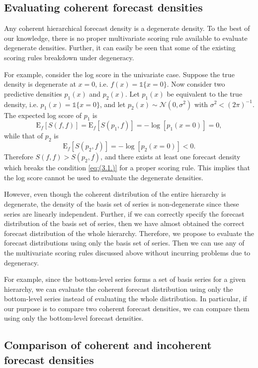 \documentclass[a4paper, 11pt]{article}
\def\E{\text{E}}
\begin{document}
\subsection{Evaluating coherent forecast densities}

Any coherent hierarchical forecast density is a degenerate density. To the best of our knowledge, there is no proper multivariate scoring rule available to evaluate degenerate densities. Further, it can easily be seen that some of the existing scoring rules breakdown under degeneracy. 

For example, consider the log score in the univariate case. Suppose the true density is degenerate at $x=0$, i.e. $f(x)=\mathbb{1}\{x=0\}$.   Now consider two predictive densities $p_1(x)$ and $p_2(x)$. Let $p_1(x)$ be equivalent to the true density, i.e. $p_1(x)=\mathbb{1}\{x=0\}$, and let $p_2(x) \sim \mathcal{N}(0,\sigma^2)$ with $\sigma^2 < (2\pi)^{-1}$. The expected log score of $p_1$ is
$$
\E_f[S(f,f)] = \E_f[S(p_1,f)] = -\log[p_1(x=0)]=0,
$$
while that of $p_2$ is
$$
\E_f[S(p_2,f)] = -\log[p_2(x=0)]<0.
$$
Therefore $S(f,f) > S(p_2,f)$, and there exists at least one forecast density which breaks the condition \eqref{eq:(3.1.)} for a proper scoring rule. This implies that the log score cannot be used to evaluate the degenerate densities.

However, even though the coherent distribution of the entire hierarchy is degenerate, the density of the basis set of series is non-degenerate since these series are linearly independent. Further, if we can correctly specify the forecast distribution of the basis set of series, then we have almost obtained the correct forecast distribution of the whole hierarchy. Therefore, we propose to evaluate the forecast distributions using only the basis set of series. Then we can use any of the multivariate scoring rules discussed above without incurring problems due to degeneracy.

For example, since the bottom-level series forms a set of basis series for a given hierarchy, we can evaluate the coherent forecast distribution using only the bottom-level series instead of evaluating the whole distribution. In particular, if our purpose is to compare two coherent forecast densities, we can compare them using only the bottom-level forecast densities.

\subsection{Comparison of coherent and incoherent forecast densities}
\end{document}
